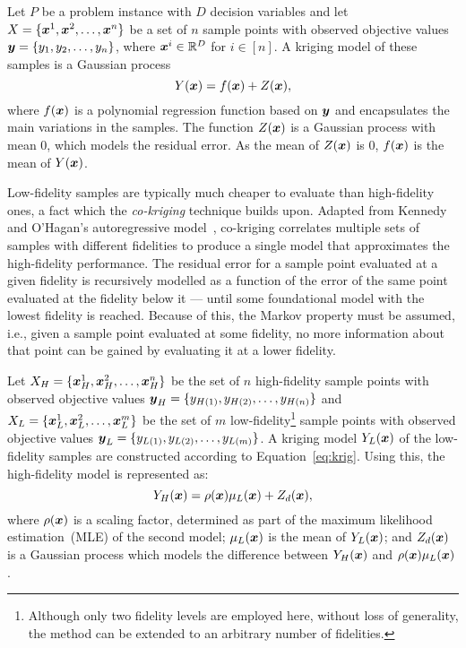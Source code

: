 Let $P$ be a problem instance with $D$ decision variables and let $X = \{\boldsymbol{x}^1,\boldsymbol{x}^2,\dots,\boldsymbol{x}^n\}$ be a set of $n$ sample points with observed objective values $\boldsymbol{y} = \{y_1,y_2,\dots,y_n\}$, where $\boldsymbol{x}^i \in \mathbb{R}^D$ for $i \in [n]$. A kriging model of these samples is a Gaussian process 
\begin{equation}
Y(\boldsymbol{x}) = f(\boldsymbol{x}) + Z(\boldsymbol{x}),\label{eq:krig}
\end{equation}
where $f(\boldsymbol{x})$ is a polynomial regression function based on $\boldsymbol{y}$ and encapsulates the main variations in the samples. The function $Z(\boldsymbol{x})$ is a Gaussian process with mean $0$, which models the residual error. As the mean of $Z(\boldsymbol{x})$ is 0, $f(\boldsymbol{x})$ is the mean of $Y(\boldsymbol{x})$. 

Low-fidelity samples are typically much cheaper to evaluate than high-fidelity ones, a fact which the \emph{co-kriging} technique builds upon. Adapted from Kennedy and O'Hagan's autoregressive model~\cite{kennedy2000predicting}, co-kriging correlates multiple sets of samples with different fidelities to produce a single model that approximates the high-fidelity performance. The residual error for a sample point evaluated at a given fidelity is recursively modelled as a function of the error of the same point evaluated at the fidelity below it --- until some foundational model with the lowest fidelity is reached. Because of this, the Markov property must be assumed, i.e., given a sample point evaluated at some fidelity, no more information about that point can be gained by evaluating it at a lower fidelity.

Let $X_H = \{\boldsymbol{x}_H^1,\boldsymbol{x}_H^2,\dots,\boldsymbol{x}_H^n\}$ be the set of $n$ high-fidelity sample points with observed objective values $\boldsymbol{y}_H = \{y_{H(1)},y_{H(2)},\dots,y_{H(n)}\}$ and $X_L = \{\boldsymbol{x}_L^1,\boldsymbol{x}_L^2,\dots,\boldsymbol{x}_L^m\}$ be the set of $m$ low-fidelity\footnote{Although only two fidelity levels are employed here, without loss of generality, the method can be extended to an arbitrary number of fidelities.} sample points with observed objective values $\boldsymbol{y}_L = \{y_{L(1)},y_{L(2)},\dots,y_{L(m)}\}$. A kriging model $Y_L(\boldsymbol{x})$ of the low-fidelity samples are constructed according to Equation~\ref{eq:krig}. Using this, the high-fidelity model is represented as:
\begin{equation}
Y_H(\boldsymbol{x}) = \rho(\boldsymbol{x})\mu_L(\boldsymbol{x}) + Z_d(\boldsymbol{x}),
\end{equation} 
where $\rho(\boldsymbol{x})$ is a scaling factor, determined as part of the maximum likelihood estimation~(MLE) of the second model; $\mu_L(\boldsymbol{x})$ is the mean of $Y_L(\boldsymbol{x})$; and $Z_d(\boldsymbol{x})$ is a Gaussian process which models the difference between $Y_H(\boldsymbol{x})$ and $\rho(\boldsymbol{x})\mu_L(\boldsymbol{x})$.

